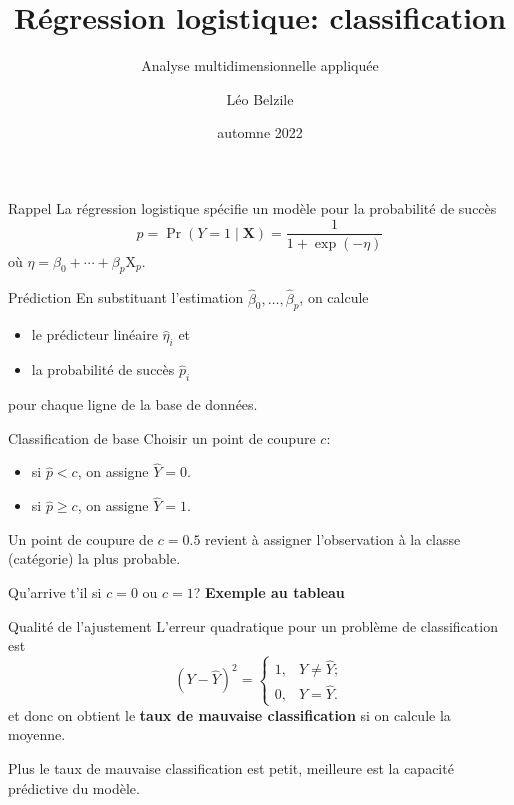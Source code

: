 \documentclass[
  ignorenonframetext,
]{beamer}
\title{Régression logistique: classification}
\subtitle{Analyse multidimensionnelle appliquée}
\author{Léo Belzile}
\date{automne 2022}
\institute{HEC Montréal}
\providecommand{\tightlist}{%
  \setlength{\itemsep}{0pt}\setlength{\parskip}{0pt}}\usepackage{longtable,booktabs,array}
\begin{document}
\frame{\titlepage}
\ifdefined\Shaded\renewenvironment{Shaded}{\begin{tcolorbox}[sharp corners, interior hidden, boxrule=0pt, breakable, frame hidden, borderline west={3pt}{0pt}{shadecolor}, enhanced]}{\end{tcolorbox}}\fi

\begin{frame}{Rappel}
\protect\hypertarget{rappel}{}
La régression logistique spécifie un modèle pour la probabilité de
succès \[p = \Pr(Y=1 \mid \mathbf{X}) = \frac{1}{1+\exp(-\eta)}\] où
\(\eta = \beta_0 + \cdots + \beta_p \mathrm{X}_p\).
\end{frame}

\begin{frame}{Prédiction}
\protect\hypertarget{pruxe9diction}{}
En substituant l'estimation
\(\widehat{\beta}_0, \ldots, \widehat{\beta}_p\), on calcule

\begin{itemize}
\tightlist
\item
  le prédicteur linéaire \(\widehat{\eta}_i\) et
\item
  la probabilité de succès \(\widehat{p}_i\)
\end{itemize}

pour chaque ligne de la base de données.
\end{frame}

\begin{frame}{Classification de base}
\protect\hypertarget{classification-de-base}{}
Choisir un point de coupure \(c\):

\begin{itemize}
\tightlist
\item
  si \(\widehat{p} < c\), on assigne \(\widehat{Y}=0\).
\item
  si \(\widehat{p} \geq c\), on assigne \(\widehat{Y}=1\).
\end{itemize}

Un point de coupure de \(c=0.5\) revient à assigner l'observation à la
classe (catégorie) la plus probable.

Qu'arrive t'il si \(c=0\) ou \(c=1\)? \textbf{Exemple au tableau}
\end{frame}

\begin{frame}{Qualité de l'ajustement}
\protect\hypertarget{qualituxe9-de-lajustement}{}
L'erreur quadratique pour un problème de classification est
\[(Y-\widehat{Y})^2 = \begin{cases} 1, & Y \neq \widehat{Y}; \\0, & Y = \widehat{Y}.\end{cases}\]
et donc on obtient le \textbf{taux de mauvaise classification} si on
calcule la moyenne.

Plus le taux de mauvaise classification est petit, meilleure est la
capacité prédictive du modèle.
\end{frame}
\end{document}
